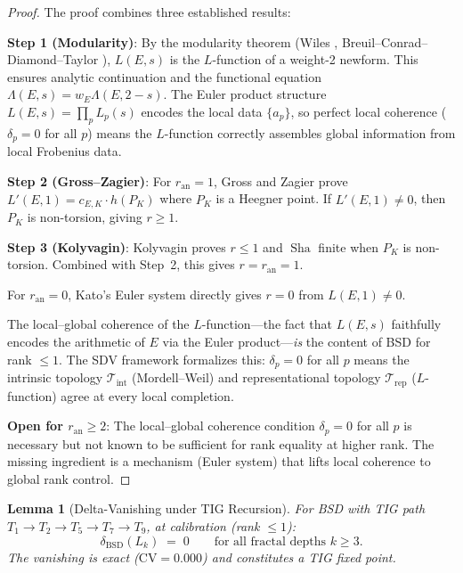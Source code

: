 \documentclass[11pt]{article}
\newtheorem{lemma}[theorem]{Lemma}
\DeclareMathOperator{\Sha}{Sha}
\begin{document}
\begin{proof}
The proof combines three established results:

\textbf{Step 1 (Modularity)}: By the modularity theorem (Wiles \cite{Wiles},
Breuil--Conrad--Diamond--Taylor \cite{BCDT}), $L(E,s)$ is the $L$-function of
a weight-2 newform.  This ensures analytic continuation and the functional
equation $\Lambda(E,s) = w_E \Lambda(E,2-s)$.  The Euler product structure
$L(E,s) = \prod_p L_p(s)$ encodes the local data $\{a_p\}$, so perfect
local coherence ($\delta_p = 0$ for all $p$) means the $L$-function correctly
assembles global information from local Frobenius data.

\textbf{Step 2 (Gross--Zagier)}: For $r_{\mathrm{an}} = 1$, Gross and Zagier
\cite{GZ} prove $L'(E,1) = c_{E,K} \cdot \hat{h}(P_K)$ where $P_K$ is a
Heegner point.  If $L'(E,1) \neq 0$, then $P_K$ is non-torsion, giving
$r \geq 1$.

\textbf{Step 3 (Kolyvagin)}: Kolyvagin \cite{Koly} proves $r \leq 1$ and
$\Sha$ finite when $P_K$ is non-torsion.  Combined with Step~2, this gives
$r = r_{\mathrm{an}} = 1$.

For $r_{\mathrm{an}} = 0$, Kato's Euler system \cite{Kato} directly gives
$r = 0$ from $L(E,1) \neq 0$.

The local--global coherence of the $L$-function---the fact that $L(E,s)$
faithfully encodes the arithmetic of $E$ via the Euler product---\emph{is} the
content of BSD for rank $\leq 1$.  The SDV framework formalizes this:
$\delta_p = 0$ for all $p$ means the intrinsic topology $\mathcal{T}_{\mathrm{int}}$
(Mordell--Weil) and representational topology $\mathcal{T}_{\mathrm{rep}}$
($L$-function) agree at every local completion.

\textbf{Open for $r_{\mathrm{an}} \geq 2$}: The local--global coherence
condition $\delta_p = 0$ for all $p$ is necessary but not known to be sufficient
for rank equality at higher rank.  The missing ingredient is a mechanism
(Euler system) that lifts local coherence to global rank control.
\end{proof}

\begin{lemma}[Delta-Vanishing under TIG Recursion]
\label{lem:delta-tig-recursion}
For BSD with TIG path $T_1 \to T_2 \to T_5 \to T_7 \to T_9$, at calibration
(rank $\leq 1$):
\[
  \delta_{\mathrm{BSD}}(L_k) \;=\; 0
  \qquad \text{for all fractal depths } k \geq 3.
\]
The vanishing is exact ($\mathrm{CV} = 0.000$) and constitutes a TIG fixed
point.
\end{lemma}
\end{document}
